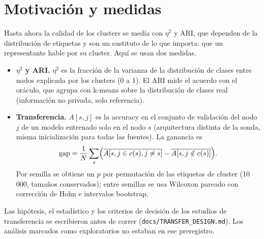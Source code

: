 \documentclass[11pt,a4paper]{article}
\begin{document}
\begin{abstract}
los tres diseños el efecto es $+0.0115$ (IC95 $[-0.008,+0.030]$, $p=0.14$), por debajo de la dispersión entre semillas. El coste de la búsqueda es el mismo para ambos brazos ($\approx$80\,000 entrenamientos locales en el v2, 25 a 50 veces menos que entrenar cada candidato con los 100 nodos); el tiempo de reloj de \texttt{nsga3} es menor en el v1 y el v4, pero no en el v2 ni en el v3. Los puntos (3) exploratorio, (4) y los análisis de evolución por generación de las Secciones~\ref{sec:p3} y~\ref{sec:moea} son post hoc; (5), (6) y (7) se preregistraron, y la réplica, el Paso D y el v4 siguen diseños fijados antes de correr. \textbf{(8)} Una confirmatoria preregistrada con semillas nuevas (10--19) confirma que el MOEA encuentra mejores modelos pequeños que la búsqueda aleatoria en el espacio grande (v4: $+0.204$ de accuracy con tamaño $\le0.005$, 10/10) y que alcanza con la mitad de las evaluaciones un archivo mejor que el de la aleatoria completa en el v2 ($+0.024$, 9/10); ambas afirmaciones no se cumplen en el otro diseño (Holm). Una ablación (20 semillas por diseño) muestra que el objetivo por cluster mejora el hipervolumen reentrenado ($+0.055$ en v2, $+0.035$ en v4) y que la ventaja en modelos livianos viene del objetivo de tamaño.
\end{abstract}

\section{Motivación y medidas}
Hasta ahora la calidad de los clusters se medía con $\eta^2$ y ARI, que dependen de la distribución de etiquetas y son un sustituto de lo que importa: que un representante hable por su cluster. Aquí se usan dos medidas.
\begin{itemize}[leftmargin=*,itemsep=2pt]
\item \textbf{$\eta^2$ y ARI.} $\eta^2$ es la fracción de la varianza de la distribución de clases entre nodos explicada por los clusters (0 a 1). El ARI mide el acuerdo con el oráculo, que agrupa con k-means sobre la distribución de clases real (información no privada, solo referencia).
\item \textbf{Transferencia.} $A[s,j]$ es la accuracy en el conjunto de validación del nodo $j$ de un modelo entrenado solo en el nodo $s$ (arquitectura distinta de la sonda, misma inicialización para todas las fuentes). La ganancia es
\[
\mathrm{gap}=\frac1N\sum_s\Bigl(\overline{A[s,j\in c(s),j\neq s]}-\overline{A[s,j\notin c(s)]}\Bigr).
\]
Por semilla se obtiene un $p$ por permutación de las etiquetas de cluster (10\,000, tamaños conservados); entre semillas se usa Wilcoxon pareado con corrección de Holm e intervalos bootstrap.
\end{itemize}
Las hipótesis, el estadístico y los criterios de decisión de los estudios de transferencia se escribieron antes de correr (\texttt{docs/TRANSFER\_DESIGN.md}). Los análisis marcados como exploratorios no estaban en ese preregistro.
\end{document}
